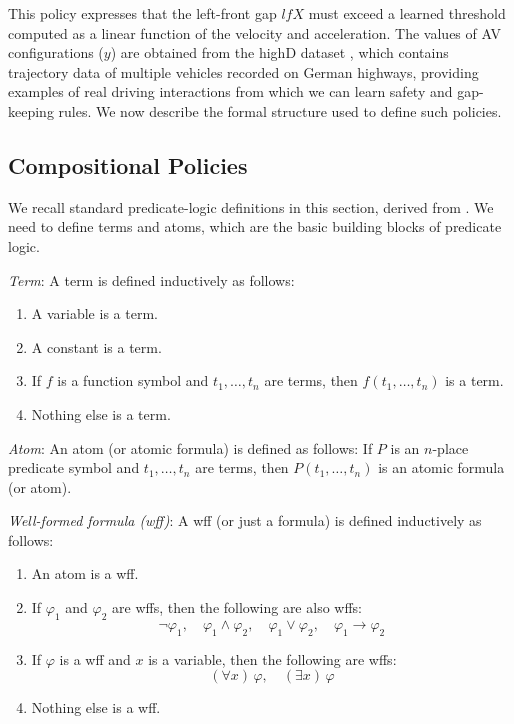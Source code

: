 This policy expresses that the left-front gap $lfX$ must exceed a learned threshold computed as a linear function of the velocity and acceleration. The values of AV configurations ($y$) are obtained from the highD dataset \cite{krajewski_highd_2018}, which contains trajectory data of multiple vehicles recorded on German highways, providing examples of real driving interactions from which we can learn safety and gap-keeping rules. We now describe the formal structure used to define such policies.


 



\subsection{Compositional Policies}
\label{sec:compositional_policies}
We recall standard predicate-logic definitions in this section, derived from \cite{10.5555/2974990}. We need to define terms and atoms, which are the basic building blocks of predicate logic. \vspace{0.5em}

\noindent \textit{Term}: A term is defined inductively as follows:
\begin{enumerate}
    \item A variable is a term.
    \item A constant is a term.
    \item If \( f \) is a function symbol and \( t_1, \ldots, t_n \) are terms, then \( f(t_1, \ldots, t_n) \) is a term.
    \item Nothing else is a term.
\end{enumerate}

\noindent \textit{Atom}: An atom (or atomic formula) is defined as follows: If \( P \) is an \( n \)-place predicate symbol and \( t_1, \ldots, t_n \) are terms, then \( P(t_1, \ldots, t_n) \) is an atomic formula (or atom).\vspace{0.5em}

\noindent \textit{Well-formed formula (wff)}: A wff (or just a formula) is defined inductively as follows:
\begin{enumerate}
    \item An atom is a wff.
    \item If \( \varphi_1\) and \( \varphi_2\) are wffs, then the following are also wffs:
    \[
 \lnot \varphi_1,\quad 
 \varphi_1 \land \varphi_2,\quad 
 \varphi_1 \lor \varphi_2,\quad 
 \varphi_1 \rightarrow \varphi_2
    \]
    \item If \( \varphi \) is a wff and \( x \) is a variable, then the following are wffs:
    \[
 (\forall x)\, \varphi,\quad (\exists x)\, \varphi
    \]
    \item Nothing else is a wff.
\end{enumerate}

